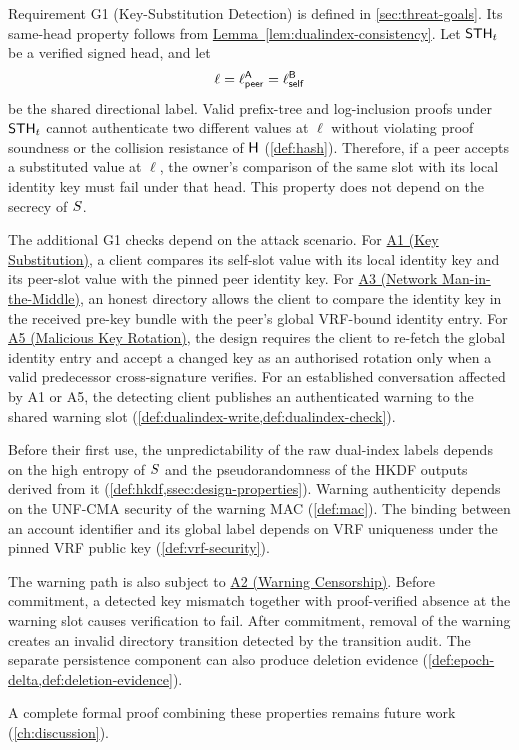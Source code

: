 \begin{definition}\label{def:g1-consistency}
Requirement G1 (Key-Substitution Detection) is defined in \cref{sec:threat-goals}. Its same-head
property follows from \hyperref[lem:dualindex-consistency]{Lemma~\ref*{lem:dualindex-consistency}}. Let $\mathsf{STH}_t$ be a verified signed head, and
let
\[
\ell=\ell^{\mathsf{A}}_{\mathsf{peer}}=\ell^{\mathsf{B}}_{\mathsf{self}}
\]
be the shared directional label. Valid prefix-tree and log-inclusion proofs under $\mathsf{STH}_t$ cannot
authenticate two different values at $\ell$ without violating proof soundness or the collision
resistance of $\mathsf{H}$ (\cref{def:hash}). Therefore, if a peer accepts a substituted value at
$\ell$, the owner's comparison of the same slot with its local identity key must fail under that
head. This property does not depend on the secrecy of $S$.

The additional G1 checks depend on the attack scenario. For
\hyperref[sc:threat-a1]{A1 (Key Substitution)}, a client compares its self-slot value
with its local identity key and its peer-slot value with the pinned peer identity key. For
\hyperref[sc:threat-a3]{A3 (Network Man-in-the-Middle)}, an honest directory allows
the client to compare the identity key in the received pre-key bundle with the peer's global
VRF-bound identity entry. For \hyperref[sc:threat-a5]{A5 (Malicious Key Rotation)}, the design
requires the client to re-fetch the global identity entry and accept a changed key as an authorised
rotation only when a valid predecessor cross-signature verifies. For an established conversation
affected by A1 or A5, the detecting client publishes an authenticated warning to the shared warning
slot (\cref{def:dualindex-write,def:dualindex-check}).

Before their first use, the unpredictability of the raw dual-index labels depends on the high
entropy of $S$ and the pseudorandomness of the HKDF outputs derived from it
(\cref{def:hkdf,ssec:design-properties}). Warning authenticity depends on the UNF-CMA security of
the warning MAC (\cref{def:mac}). The binding between an account identifier and its global label
depends on VRF uniqueness under the pinned VRF public key (\cref{def:vrf-security}).

The warning path is also subject to
\hyperref[sc:threat-a2]{A2 (Warning Censorship)}. Before commitment, a detected key mismatch
together with proof-verified absence at the warning slot causes verification to fail. After
commitment, removal of the warning creates an invalid directory transition detected by the
transition audit. The separate persistence component can also produce deletion evidence
(\cref{def:epoch-delta,def:deletion-evidence}).

A complete formal proof combining these properties remains future work
(\cref{ch:discussion}).
\end{definition}
